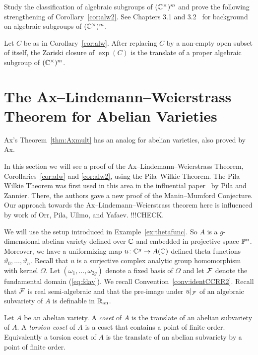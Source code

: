 \begin{exercise}
  Study the classification of algebraic subgroups of $({\mathbb{C}}^\times)^m$
  and prove the following strengthening of Corollary~\ref{cor:alw2}.
  See Chapters 3.1 and 3.2~\cite{BG} for background on algebraic
  subgroups of $({\mathbb{C}}^\times)^m$. 
\end{exercise}
\begin{corollary}
  \label{cor:alw2}
  Let $C$ be as in Corollary~\ref{cor:alw}. After replacing $C$ by a
  non-empty open subset of itself, the Zariski closure of $\exp(C)$ is
  the translate of a proper algebraic subgroup of $({\mathbb{C}}^\times)^m$. 
\end{corollary}

\section{The Ax--Lindemann--Weierstrass Theorem for Abelian Varieties}
\label{sec:alwav}

Ax's Theorem~\ref{thm:Axmult} has an analog for abelian varieties,
also proved by Ax.

In this section we will see a proof of the Ax--Lindemann--Weierstrass
Theorem, Corollaries~\ref{cor:alw} and \ref{cor:alw2}, using the
Pila--Wilkie Theorem. The Pila--Wilkie Theorem was first used in this
area in the influential paper~\cite{PilaZannier} by Pila and Zannier.
There, the authors gave a new proof of the Manin--Mumford Conjecture.
Our approach towards the Ax--Lindemann--Weierstrass theorem here is
influenced by work of Orr, Pila, Ullmo, and Yafaev. !!!CHECK.

We will use the setup introduced in Example~\ref{ex:thetafunc}. So $A$
is a $g$-dimensional abelian variety defined over ${\mathbb{C}}$ and embedded
in projective space ${\mathbb{P}}^n$. Moreover, we have a uniformizing map
$u\colon {\mathbb{C}}^g\rightarrow A({\mathbb{C}})$ defined theta functions
$\vartheta_0,\ldots,\vartheta_n$. Recall that $u$ is a surjective
complex analytic group homomorphism with kernel $\Omega$. Let
$(\omega_1,\ldots,\omega_{2g})$ denote a fixed basis of $\Omega$ and
let ${\mathcal F}$ denote the fundamental domain (\ref{eq:fdav}).
We recall Convention~\ref{conv:identCCRR2}. 
Recall that ${\mathcal F}$ is real semi-algebraic and that the pre-image under
$u|_{{\mathcal F}}$ of an algebraic subvariety of $A$ is definable in ${{\mathbb{R}}_{\mathrm{an}}}$.


\begin{definition}
  Let $A$ be an abelian variety. A \emph{coset} of $A$ is the translate of an
  abelian subvariety of $A$. A \emph{torsion coset} of $A$ is a coset
  that contains a point of finite order. Equivalently a torsion coset
  of $A$ is the translate of an abelian subvariety by a point of
  finite order. 
\end{definition}


